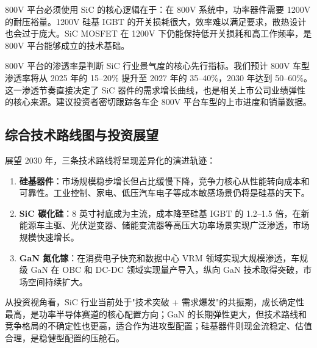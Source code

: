 800V 平台必须使用 SiC 的核心逻辑在于：在 800V 系统中，功率器件需要 1200V 的耐压裕量。1200V 硅基 IGBT 的开关损耗很大，效率难以满足要求，散热设计也会过于庞大。SiC MOSFET 在 1200V 下仍能保持低开关损耗和高工作频率，是 800V 平台能够成立的技术基础。

\begin{keyinsight}
800V 平台的渗透率是判断 SiC 行业景气度的核心先行指标。我们预计 800V 车型渗透率将从 2025 年的 15–20\% 提升至 2027 年的 35–40\%，2030 年达到 50–60\%。这一渗透节奏直接决定了 SiC 器件的需求增长曲线，也是相关上市公司业绩弹性的核心来源。建议投资者密切跟踪各车企 800V 平台车型的上市进度和销量数据。
\end{keyinsight}

\subsection{综合技术路线图与投资展望}

展望 2030 年，三条技术路线将呈现差异化的演进轨迹：

\begin{enumerate}[leftmargin=2em]
\item \textbf{硅基器件}：市场规模稳步增长但占比缓慢下降，竞争力核心从性能转向成本和可靠性。工业控制、家电、低压汽车电子等成本敏感场景仍将是硅基的天下。
\item \textbf{SiC 碳化硅}：8 英寸衬底成为主流，成本降至硅基 IGBT 的 1.2–1.5 倍，在新能源车主驱、光伏逆变器、储能变流器等高压大功率场景实现广泛渗透，市场规模快速增长。
\item \textbf{GaN 氮化镓}：在消费电子快充和数据中心 VRM 领域实现大规模渗透，车规级 GaN 在 OBC 和 DC-DC 领域实现量产导入，纵向 GaN 技术取得突破，市场空间持续扩大。
\end{enumerate}

从投资视角看，SiC 行业当前处于"技术突破 + 需求爆发"的共振期，成长确定性最高，是功率半导体赛道的核心配置方向；GaN 的长期弹性更大，但技术路线和竞争格局的不确定性也更高，适合作为进攻型配置；硅基器件则现金流稳定、估值合理，是稳健型配置的压舱石。

